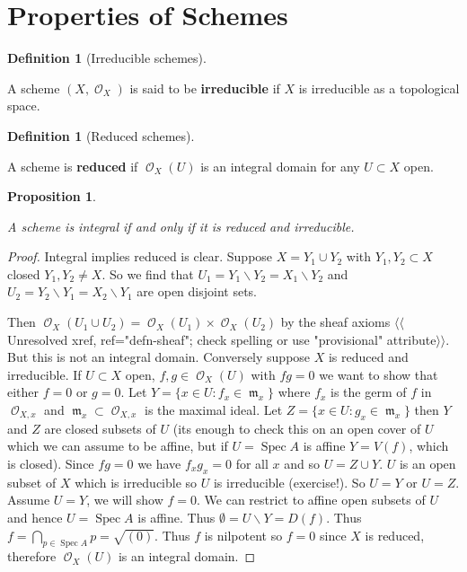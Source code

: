 \documentclass[10pt,]{book}
\newcommand{\terminology}[1]{\textbf{#1}}
\theoremstyle{plain}
\newtheorem{proposition}[theorem]{Proposition}
\theoremstyle{definition}
\newtheorem{definition}[theorem]{Definition}
\numberwithin{equation}{section}
\DeclareMathOperator{\sO}{\mathcal{O}}
\DeclareMathOperator{\fm}{\mathfrak{m}}
\DeclareMathOperator{\Spec}{Spec}
\begin{document}
\section[Properties of Schemes]{Properties of Schemes}\label{sec-props-schemes}
\begin{definition}[Irreducible schemes]\label{definition-7}

            A scheme \((X, \sO_X)\) is said to be \terminology{irreducible} if \(X\) is irreducible as a topological space.
          \end{definition}
\begin{definition}[Reduced schemes]\label{definition-8}

            A scheme is \terminology{reduced} if \(\sO_X(U)\) is an integral domain for any \(U \subset X\) open.
          \end{definition}
\begin{proposition}\label{proposition-3}

            A scheme is integral if and only if it is reduced and irreducible.
          \end{proposition}
\begin{proof}

            Integral implies reduced is clear. \newline{}
            Suppose \(X  = Y_1 \cup Y_2\) with \(Y_1,Y_2 \subset X\) closed \(Y_1,Y_2 \ne X\).
            So we find that \(U_1 = Y_1 \smallsetminus Y_2 = X_1 \smallsetminus Y_2\) and \(U_2 = Y_2 \smallsetminus Y_1 = X_2 \smallsetminus Y_1\) are open disjoint sets.

            Then \(\sO_X(U_1\cup U_2) = \sO_X(U_1) \times \sO_X(U_2)\) by the sheaf axioms {$\langle\langle$Unresolved xref, ref="defn-sheaf"; check spelling or use "provisional" attribute$\rangle\rangle$}.
            But this is not an integral domain.
            Conversely suppose \(X\) is reduced and irreducible.
            If \(U \subset X\) open, \(f,g\in \sO_X(U)\) with \(fg = 0\) we want to show that either \(f=0\) or \(g= 0\).
            Let \(Y  =\{x\in U : f_x \in \fm_x\}\) where \(f_x\) is the germ of \(f\) in \(\sO_{X,x}\) and \(\fm_x\subset \sO_{X,x}\) is the maximal ideal.
            Let \(Z = \{x\in  U: g_x \in \fm_x\}\) then \(Y\) and \(Z\) are closed subsets of \(U\) (its enough to check this on an open cover of \(U\) which we can assume to be affine, but if \(U = \Spec A\) is affine \(Y = V(f)\), which is closed).
            Since \(fg = 0\) we have \(f_x g_x = 0\) for all \(x\) and so \(U = Z\cup Y\).
            \(U\) is an open subset of \(X\) which is irreducible so \(U\) is irreducible (exercise!).
            So \(U = Y\) or \(U = Z\).
            Assume \(U = Y\), we will show \(f = 0\).
            We can restrict to affine open subsets of \(U\) and hence \(U =\Spec A\) is affine. Thus \(\emptyset = U \smallsetminus Y = D(f)\).
            Thus \(f = \bigcap_{p\in\Spec A} p = \sqrt{(0)}\).
            Thus \(f\) is nilpotent so \(f = 0\) since \(X\) is reduced, therefore \(\sO_X(U)\) is an integral domain.
          \end{proof}
\end{document}
